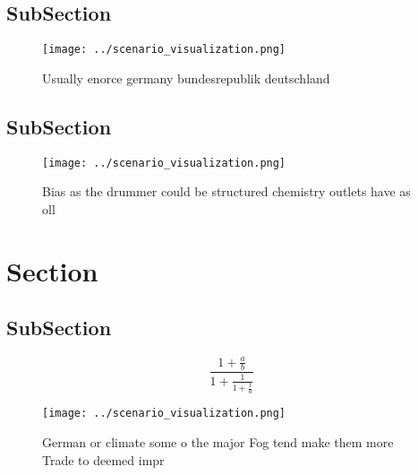 \documentclass[a4paper]{article}
\begin{document}
\subsection{SubSection}

\begin{figure}
\centering
\texttt{[image: ../scenario\_visualization.png]}
\caption{Usually enorce germany bundesrepublik deutschland
}
\end{figure}
 
\subsection{SubSection}

\begin{figure}
\centering
\texttt{[image: ../scenario\_visualization.png]}
\caption{Bias as the drummer could be structured chemistry outlets have as oll
}
\end{figure}
 
\section{Section}

\subsection{SubSection}

\[ \frac{1+\frac{a}{b}}{1+\frac{1}{1+\frac{1}{a}}} \]

\begin{figure}
\centering
\texttt{[image: ../scenario\_visualization.png]}
\caption{German or climate some o the major Fog tend make them more Trade to deemed impr
}
\end{figure}
 
\end{document}
